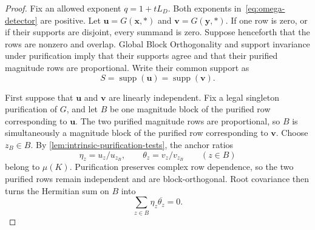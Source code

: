 \documentclass[11pt]{article}
\theoremstyle{plain}
\theoremstyle{definition}
\theoremstyle{remark}
\DeclareMathOperator{\supp}{supp}
\begin{document}
\begin{proof}
Fix an allowed exponent $q=1+tL_D$.  Both exponents
in~\eqref{eq:omega-detector} are positive.  Let
$\mathbf u=G(\mathbf x,\ast)$ and $\mathbf v=G(\mathbf y,\ast)$.  If one row
is zero, or if their supports are disjoint, every summand is zero.
Suppose henceforth that the rows are nonzero and overlap.  Global Block
Orthogonality and support invariance under purification imply that their
supports agree and that their purified magnitude rows are proportional.
Write their common support as
\[
  S=\supp(\mathbf u)=\supp(\mathbf v).
\]

First suppose that $\mathbf u$ and $\mathbf v$ are linearly independent.
Fix a legal singleton purification of $G$, and let $B$ be one magnitude block
of the purified row corresponding to $\mathbf u$.  The two purified
magnitude rows are proportional, so $B$ is simultaneously a magnitude block
of the purified row corresponding to $\mathbf v$.  Choose $z_B\in B$.  By
\cref{lem:intrinsic-purification-tests}, the anchor ratios
\begin{equation}
  \eta_z=u_z/u_{z_B},
  \qquad
  \theta_z=v_z/v_{z_B}
  \qquad(z\in B)
  \label{eq:block-anchor-ratios}
\end{equation}
belong to $\mu(K)$.  Purification preserves complex row dependence, so the
two purified rows remain independent and are block-orthogonal.  Root
covariance then turns the Hermitian sum on $B$ into
\begin{equation}
  \sum_{z\in B}\eta_z\overline{\theta_z}=0.
  \label{eq:purified-root-sum}
\end{equation}


\end{proof}
\end{document}
